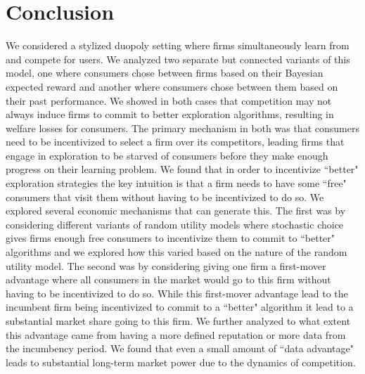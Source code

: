 \documentclass[../competing_bandits.tex]{subfiles}
\begin{document}
\section{Conclusion}\label{sec:conclusion}

We considered a stylized duopoly setting where firms simultaneously learn from and compete for users. We analyzed two separate but connected variants of this model, one where consumers chose between firms based on their Bayesian expected reward and another where consumers chose between them based on their past performance. We showed in both cases that competition may not always induce firms to commit to better exploration algorithms, resulting in welfare losses for consumers. The primary mechanism in both was that consumers need to be incentivized to select a firm over its competitors, leading firms that engage in exploration to be starved of consumers before they make enough progress on their learning problem. We found that in order to incentivize ``better" exploration strategies the key intuition is that a firm needs to have some ``free" consumers that visit them without having to be incentivized to do so. We explored several economic mechanisms that can generate this. The first was by considering different variants of random utility models where stochastic choice gives firms enough free consumers to incentivize them to commit to ``better" algorithms and we explored how this varied based on the nature of the random utility model. The second was by considering giving one firm a first-mover advantage where all consumers in the market would go to this firm without having to be incentivized to do so. While this first-mover advantage lead to the incumbent firm being incentivized to commit to a ``better" algorithm it lead to a substantial market share going to this firm. We further analyzed to what extent this advantage came from having a more defined reputation or more data from the incumbency period. We found that even a small amount of ``data advantage" leads to substantial long-term market power due to the dynamics of competition.
\end{document}
